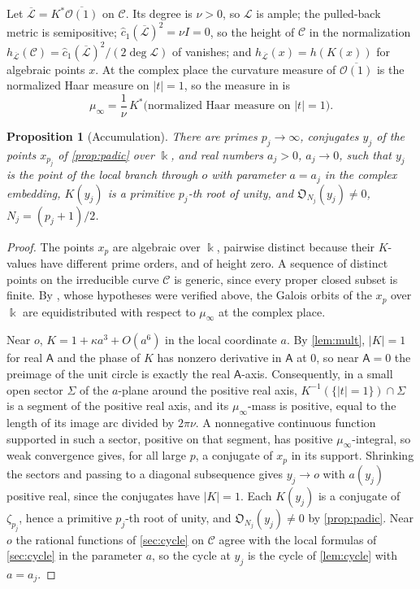\documentclass[11pt]{amsart}
\numberwithin{equation}{section}
\newtheorem{proposition}[theorem]{Proposition}
\theoremstyle{definition}
\theoremstyle{remark}
\newcommand{\abs}[1]{\lvert #1\rvert}
\newcommand{\Obs}{\mathfrak{O}}
\newcommand{\kk}{\Bbbk}
\newcommand{\sA}{\mathsf A}
\begin{document}
Let $\overline{\mathcal L}=K^*\overline{\mathcal O(1)}$ on $\mathcal C$. Its degree is $\nu>0$, so $\mathcal L$ is ample; the pulled-back metric is semipositive; $\widehat c_1(\overline{\mathcal L})^2=\nu I=0$, so the height of $\mathcal C$ in the normalization $h_{\overline{\mathcal L}}(\mathcal C)=\widehat c_1(\overline{\mathcal L})^2/(2\deg\mathcal L)$ of \cite{Yuan} vanishes; and $h_{\overline{\mathcal L}}(x)=h(K(x))$ for algebraic points $x$. At the complex place the curvature measure of $\overline{\mathcal O(1)}$ is the normalized Haar measure on $\abs t=1$, so the measure in \cite[Theorem 3.1]{Yuan} is
\[
\mu_\infty=\frac1\nu\,K^*\bigl(\text{normalized Haar measure on }\abs t=1\bigr).
\]

\begin{proposition}[Accumulation]\label{prop:accum}
There are primes $p_j\to\infty$, conjugates $y_j$ of the points $x_{p_j}$ of \cref{prop:padic} over $\kk$, and real numbers $a_j>0$, $a_j\to0$, such that $y_j$ is the point of the local branch through $o$ with parameter $a=a_j$ in the complex embedding, $K(y_j)$ is a primitive $p_j$-th root of unity, and $\Obs_{N_j}(y_j)\ne0$, $N_j=(p_j+1)/2$.
\end{proposition}

\begin{proof}
The points $x_p$ are algebraic over $\kk$, pairwise distinct because their $K$-values have different prime orders, and of height zero. A sequence of distinct points on the irreducible curve $\mathcal C$ is generic, since every proper closed subset is finite. By \cite[Theorem 3.1]{Yuan}, whose hypotheses were verified above, the Galois orbits of the $x_p$ over $\kk$ are equidistributed with respect to $\mu_\infty$ at the complex place.

Near $o$, $K=1+\kappa a^3+O(a^6)$ in the local coordinate $a$. By \cref{lem:mult}, $\abs K=1$ for real $\sA$ and the phase of $K$ has nonzero derivative in $\sA$ at $0$, so near $\sA=0$ the preimage of the unit circle is exactly the real $\sA$-axis. Consequently, in a small open sector $\Sigma$ of the $a$-plane around the positive real axis, $K^{-1}(\{\abs t=1\})\cap\Sigma$ is a segment of the positive real axis, and its $\mu_\infty$-mass is positive, equal to the length of its image arc divided by $2\pi\nu$. A nonnegative continuous function supported in such a sector, positive on that segment, has positive $\mu_\infty$-integral, so weak convergence gives, for all large $p$, a conjugate of $x_p$ in its support. Shrinking the sectors and passing to a diagonal subsequence gives $y_j\to o$ with $a(y_j)$ positive real, since the conjugates have $\abs{K}=1$. Each $K(y_j)$ is a conjugate of $\zeta_{p_j}$, hence a primitive $p_j$-th root of unity, and $\Obs_{N_j}(y_j)\ne0$ by \cref{prop:padic}. Near $o$ the rational functions of \cref{sec:cycle} on $\mathcal C$ agree with the local formulas of \cref{sec:cycle} in the parameter $a$, so the cycle at $y_j$ is the cycle of \cref{lem:cycle} with $a=a_j$.
\end{proof}
\end{document}
